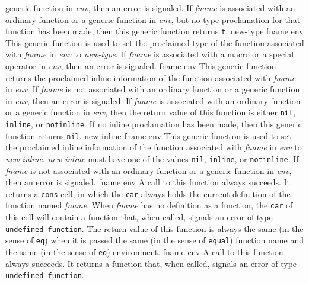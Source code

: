 generic function in \textit{env}, then an error is signaled.
\vskip -0.02cm
If \textit{fname} is associated with an ordinary function or a generic
function in \textit{env}, but no type proclamation for that function
has been made, then this generic function returns \texttt{t}.
\vskip -0.02cm
 {new-type fname env}
\vskip -0.2cm
This generic function is used to set the proclaimed type of the
function associated with \textit{fname} in \textit{env}
to \textit{new-type}.
\vskip -0.02cm
If \textit{fname} is associated with a macro or a special operator
in \textit{env}, then an error is signaled.
\vskip -0.02cm
 {fname env}
\vskip -0.2cm
This generic function returns the proclaimed inline information of
the function associated with \textit{fname} in \textit{env}.
\vskip -0.02cm
If \textit{fname} is not associated with an ordinary function or a
generic function in \textit{env}, then an error is signaled.
\vskip -0.02cm
If \textit{fname} is associated with an ordinary function or a
generic function in \textit{env}, then the return value of this
function is either \texttt{nil}, \texttt{inline}, or \texttt{notinline}.  If no inline
proclamation has been made, then this generic function returns
\texttt{nil}.
\vskip -0.02cm
 {new-inline fname env}
\vskip -0.2cm
This generic function is used to set the proclaimed inline
information of the function associated with \textit{fname} in
\textit{env} to \textit{new-inline}.
\vskip -0.02cm
\textit{new-inline} must have one of the values \texttt{nil}, \texttt{inline}, or
\texttt{notinline}.
\vskip -0.02cm
If \textit{fname} is not associated with an ordinary function or a
generic function in \textit{env}, then an error is signaled.
\vskip -0.02cm
 {fname env}
\vskip -0.2cm
A call to this function always succeeds.  It returns a \texttt{cons} cell,
in which the \texttt{car} always holds the current definition of the
function named \textit{fname}.  When \textit{fname} has no
definition as a function, the \texttt{car} of this cell will contain a
function that, when called, signals an error of type
\texttt{undefined-function}.  The return value of this function is always
the same (in the sense of \texttt{eq}) when it is passed the same (in the
sense of \texttt{equal}) function name and the same (in the sense of \texttt{eq})
environment.
\vskip -0.02cm
 {fname env}
\vskip -0.2cm
A call to this function always succeeds.  It returns a function
that, when called, signals an error of type \texttt{undefined-function}.
